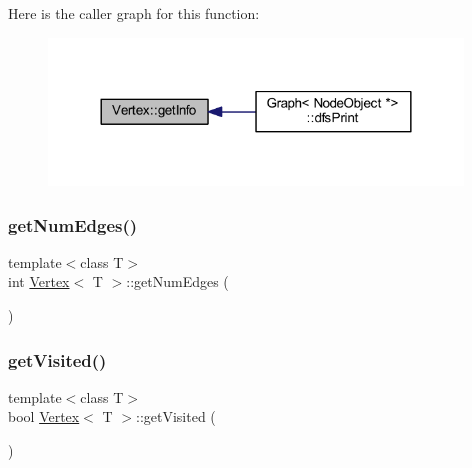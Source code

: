 Here is the caller graph for this function\+:
\nopagebreak
\begin{figure}[H]
\begin{center}
\leavevmode
\includegraphics[width=312pt]{class_vertex_a48eae2f7af2362634adab02b7b2dbec6_icgraph}
\end{center}
\end{figure}
\mbox{\label{class_vertex_ab5d881e2a8abc1de4ad8990133cae619}} 
\subsubsection{\texorpdfstring{get\+Num\+Edges()}{getNumEdges()}}
{\footnotesize\ttfamily template$<$class T$>$ \\
int \hyperlink{class_vertex}{Vertex}$<$ T $>$\+::get\+Num\+Edges (\begin{DoxyParamCaption}{ }\end{DoxyParamCaption})\hspace{0.3cm}{\ttfamily [inline]}}

\mbox{\label{class_vertex_a32cb66998d594d10170f448c9a25757c}} 
\subsubsection{\texorpdfstring{get\+Visited()}{getVisited()}}
{\footnotesize\ttfamily template$<$class T$>$ \\
bool \hyperlink{class_vertex}{Vertex}$<$ T $>$\+::get\+Visited (\begin{DoxyParamCaption}{ }\end{DoxyParamCaption})\hspace{0.3cm}{\ttfamily [inline]}}


